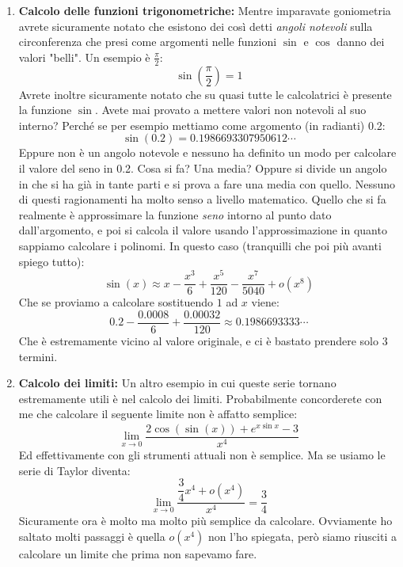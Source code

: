 \begin{enumerate}
	\item \textbf{Calcolo delle funzioni trigonometriche:} Mentre imparavate goniometria avrete sicuramente notato che esistono dei così detti \textit{angoli notevoli} sulla circonferenza che presi come argomenti nelle funzioni $\sin$ e $\cos$ danno dei valori "belli". Un esempio è $\frac{\pi}{2}$:
	\begin{equation*}
		\sin \left(\dfrac{\pi}{2}\right) = 1
	\end{equation*}
	Avrete inoltre sicuramente notato che su quasi tutte le calcolatrici è presente la funzione $\sin$. Avete mai provato a mettere valori non notevoli al suo interno? Perché se per esempio mettiamo come argomento (in radianti) 0.2:
	\begin{equation*}
		\sin(0.2) = 0.1986693307950612\cdots 
	\end{equation*}
	Eppure non è un angolo notevole e nessuno ha definito un modo per calcolare il valore del seno in 0.2. Cosa si fa? Una media? Oppure si divide un angolo in che si ha già in tante parti e si prova a fare una media con quello. Nessuno di questi ragionamenti ha molto senso a livello matematico. Quello che si fa realmente è approssimare la funzione \textit{seno} intorno al punto dato dall'argomento, e poi si calcola il valore usando l'approssimazione in quanto sappiamo calcolare i polinomi. In questo caso (tranquilli che poi più avanti spiego tutto):
	\begin{equation*}
		\sin(x) \approx x - \dfrac{x^3}{6} + \dfrac{x^5}{120} - \dfrac{x^7}{5040} + o(x^8)
	\end{equation*}
	Che se proviamo a calcolare sostituendo $1$ ad $x$ viene:
	\begin{equation*}
		0.2 - \dfrac{0.0008}{6} + \dfrac{0.00032}{120} \approx 0.1986693333 \cdots
	\end{equation*}
	Che è estremamente vicino al valore originale, e ci è bastato prendere solo 3 termini.

	\item \textbf{Calcolo dei limiti:} Un altro esempio in cui queste serie tornano estremamente utili è nel calcolo dei limiti. Probabilmente concorderete con me che calcolare il seguente limite non è affatto semplice:
		\begin{equation*}
			\lim_{x \to 0} \dfrac{2\cos(\sin(x)) + e^{x\sin{x}} - 3}{x^4}
		\end{equation*}
		Ed effettivamente con gli strumenti attuali non è semplice. Ma se usiamo le serie di Taylor diventa:
		\begin{equation*}
			\lim_{x \to 0} \dfrac{\dfrac{3}{4} x^4 + o(x^4)}{x^4} = \dfrac{3}{4}
		\end{equation*}
		Sicuramente ora è molto ma molto più semplice da calcolare. Ovviamente ho saltato molti passaggi è quella $o(x^4)$ non l'ho spiegata, però siamo riusciti a calcolare un limite che prima non sapevamo fare.

\end{enumerate}

